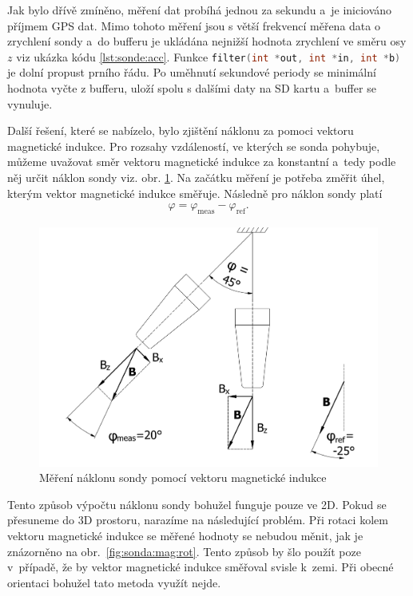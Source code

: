 \documentclass[twoside]{ctuthesis}
\theoremstyle{plain}
\theoremstyle{definition}
\theoremstyle{note}
\begin{document}
		Jak bylo dřívě zmíněno, měření dat probíhá jednou za sekundu a~je iniciováno příjmem GPS dat. Mimo tohoto měření jsou s větší frekvencí měřena data o zrychlení sondy a~do bufferu je ukládána nejnižší hodnota zrychlení ve směru osy $z$ viz ukázka kódu \ref{lst:sonde:acc}. Funkce \lstinline[language=C]|filter(int *out, int *in, int *b)| je dolní propust prního řádu. Po uměhnutí sekundové periody se minimální hodnota vyčte z bufferu, uloží spolu s dalšími daty na SD kartu a~buffer se vynuluje.
			


		Další řešení, které se nabízelo, bylo zjištění náklonu za pomoci vektoru magnetické indukce. Pro rozsahy vzdáleností, ve kterých se sonda pohybuje, můžeme uvažovat směr vektoru magnetické indukce za konstantní a~tedy podle něj určit náklon sondy viz. obr. \ref{fig:sonda:mag}. Na začátku měření je potřeba změřit úhel, kterým vektor magnetické indukce směřuje. Následně pro náklon sondy platí
		\begin{align}
			\varphi = \varphi_\text{meas} - \varphi_\text{ref}.
		\end{align}

		\begin{figure}[hbtp]
			\centering
			\includegraphics[width=.5\textwidth]{Figures/sonda_naklon_mag.pdf}
			\caption{Měření náklonu sondy pomocí vektoru magnetické indukce}
			\label{fig:sonda:mag}
		\end{figure}

		Tento způsob výpočtu náklonu sondy bohužel funguje pouze ve 2D. Pokud se přesuneme do 3D prostoru, narazíme na následující problém. Při rotaci kolem vektoru magnetické indukce se měřené hodnoty se nebudou měnit, jak je znázorněno na obr.~\ref{fig:sonda:mag:rot}. Tento způsob by šlo použít poze v~případě, že by vektor magnetické indukce směřoval svisle k~zemi. Při obecné orientaci bohužel tato metoda využít nejde.
\end{document}
